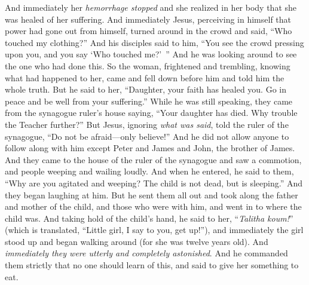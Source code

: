 \begin{biblechapter}
\verse And immediately her \textit{hemorrhage stopped} and she realized in her body that she was healed of her suffering.
\verse And immediately Jesus, perceiving in himself that power had gone out from himself, turned around in the crowd and said, “Who touched my clothing?”
\verse And his disciples said to him, “You see the crowd pressing upon you, and you say ‘Who touched me?’ ”
\verse And he was looking around to see the one who had done this.
\verse So the woman, frightened and trembling, knowing what had happened to her, came and fell down before him and told him the whole truth.
\verse But he said to her, “Daughter, your faith has healed you. Go in peace and be well from your suffering.”
\verse While he was still speaking, they came from the synagogue ruler’s house saying, “Your daughter has died. Why trouble the Teacher further?”
\verse But Jesus, ignoring \textit{what was said}, told the ruler of the synagogue, “Do not be afraid—only believe!”
\verse And he did not allow anyone to follow along with him except Peter and James and John, the brother of James.
\verse And they came to the house of the ruler of the synagogue and saw a commotion, and people weeping and wailing loudly.
\verse And when he entered, he said to them, “Why are you agitated and weeping? The child is not dead, but is sleeping.”
\verse And they began laughing at him. But he sent them all out and took along the father and mother of the child, and those who were with him, and went in to where the child was.
\verse And taking hold of the child’s hand, he said to her, “\textit{Talitha koum!}” (which is translated, “Little girl, I say to you, get up!”),
\verse and immediately the girl stood up and began walking around (for she was twelve years old). And \textit{immediately they were utterly and completely astonished}.
\verse And he commanded them strictly that no one should learn of this, and said to give her something to eat.
\end{biblechapter}

